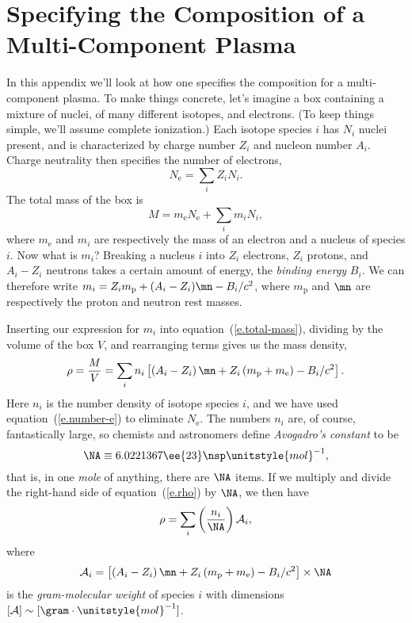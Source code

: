 \chapter[Composition]{Specifying the Composition of a Multi-Component Plasma}
\label{s.composition}
\newcommand{\mpt}{\ensuremath{m_{\mathrm{p}}}}
\newcommand{\mel}{\ensuremath{m_{\mathrm{e}}}}
\newcommand{\mol}{\unitstyle{mol}}

In this appendix we'll look at how one specifies the composition for a multi-component plasma.  To make things concrete, let's imagine a box containing a mixture of nuclei, of many different isotopes, and electrons.  (To keep things simple, we'll assume complete ionization.)  Each isotope species $i$ has $N_{i}$ nuclei present, and is characterized by charge number $Z_{i}$ and nucleon number $A_{i}$.  Charge neutrality then specifies the number of electrons,
\begin{equation}\label{e.number-e}
N_{\mathrm{e}} = \sum_{i} Z_{i} N_{i}.
\end{equation}
The total mass of the box is
\begin{equation}\label{e.total-mass}
M = \mel N_{\mathrm{e}} + \sum_{i} m_{i}N_{i},
\end{equation}
where $\mel$ and $m_{i}$ are respectively the mass of an electron and a nucleus of species $i$.  Now what is $m_{i}$? Breaking a nucleus $i$ into $Z_{i}$ electrons, $Z_{i}$ protons, and $A_{i}-Z_{i}$ neutrons takes a certain amount of energy, the \emph{binding energy} $B_{i}$.  We can therefore write $m_{i} = Z_{i}\mpt + (A_{i}-Z_{i})\mn - B_{i}/c^{2}$, where $\mpt$ and $\mn$ are respectively the proton and neutron rest masses.

Inserting our expression for $m_{i}$ into equation~(\ref{e.total-mass}), dividing by the volume of the box $V$, and rearranging terms gives us the mass density,
\begin{equation}\label{e.rho}
\rho = \frac{M}{V} = \sum_{i} n_{i}\left[ \left(A_{i}-Z_{i}\right) \mn + Z_{i}\left(\mpt + \mel\right) - B_{i}/c^{2}\right].
\end{equation}
Here $n_{i}$ is the number density of isotope species $i$, and we have used equation~(\ref{e.number-e}) to eliminate $N_{\mathrm{e}}$.  The numbers $n_{i}$ are, of course, fantastically large, so chemists and astronomers define \emph{Avogadro's constant} to be
\begin{equation}\label{e.avogadro-def}
\NA \equiv 6.0221367\ee{23}\nsp\unitstyle{mol}^{-1},
\end{equation}
that is, in one \emph{mole} of anything, there are $\NA$ items. If we multiply and divide the right-hand side of equation~(\ref{e.rho}) by $\NA$, we then have
\begin{equation}\label{e.molar-1}
\rho = \sum_{i} \left(\frac{n_{i}}{\NA}\right) \mathcal{A}_{i},
\end{equation}
where
\begin{equation}\label{e.gm-mol}
\mathcal{A}_{i} = \left[ \left(A_{i}-Z_{i}\right) \mn + Z_{i}\left(\mpt + \mel\right) - B_{i}/c^{2}\right]\times\NA
\end{equation}
is the \emph{gram-molecular weight} of species $i$ with dimensions $[\mathcal{A}]\sim[\gram\cdot\mol^{-1}]$.


